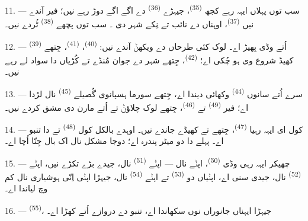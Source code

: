 11. --- سب توں پہلاں ایہہ رہے کجھ  \textsuperscript{(35)}، جیہڑے
 \textsuperscript{(36)} دے اگے اگے دوڑ رہے نیں؛ فیر آندے نیں
 \textsuperscript{(37)}، اوہناں دے نائب تے نِکے شہر دی
۔ سب توں پچھے  \textsuperscript{(38)}
ٹُردے نیں۔

\VUsaut{5.0mm}
\VUsaut{3.6mm}

12. ---  \textsuperscript{(39)} اُتے وڈی بِھیڑ اے۔ لوک کئی
طرحاں دے  ویکھݨ آندے نیں:  \textsuperscript{(40)}،
 \textsuperscript{(41)}، جِتھے کھیڈ شروع وی ہو چُکی اے؛
 \textsuperscript{(42)}، جِتھے شہر دے جوان مُنڈے تے کُڑیاں
 دا سواد لے رہے نیں۔

13. --- سرے اُتے سانوں  \textsuperscript{(44)} وکھائی دیندا اے،
جِتھے سورما ہسپانوی  گُصیلے  \textsuperscript{(45)} نال
لڑدا اے؛ فیر  \textsuperscript{(49)} تے
 \textsuperscript{(46)}، جِتھے لوک 
چلاؤݨ تے  اُتے مارن دی مشق کردے نیں۔

14. --- کول ای ایہہ رہیا  \textsuperscript{(47)}، جِتھے
 تے  کھیڈے جاندے نیں۔ اوہدے بالکل کول
 \textsuperscript{(48)} تے  دا تنبو اے۔ پہلے دا
 دو میٹر پندرہ اے؛ دوجا مشکل نال اک بال جِنّا اُچا اے۔

15. --- چھیکر ایہہ رہی وڈی  \textsuperscript{(50)}، اپݨے
 نال — اپݨے  \textsuperscript{(51)} نال، جیدے
 بڑے تکڑے نیں، اپݨے  \textsuperscript{(52)} نال، جیدی
 سنی اے، اپݨیاں دو  \textsuperscript{(53)} تے اپݨے
 \textsuperscript{(54)} نال، جیہڑا اپݨی  اِنّی
ہوشیاری نال کم وچ لیاندا اے۔

16. ---  \textsuperscript{(55)}، جیہڑا ایہناں جانوراں
نوں سکھاندا اے، تنبو دے دروازے اُتے کھڑا اے۔
\VUsaut{6.0mm}
\VUfilet{22mm}
